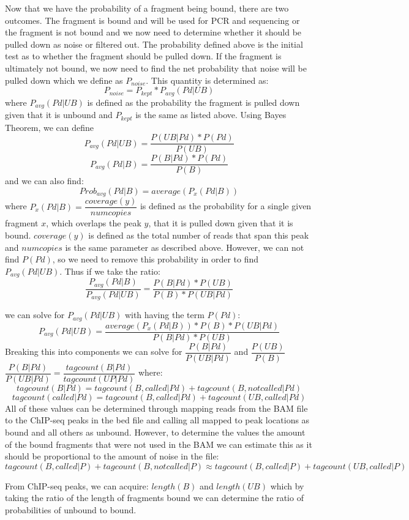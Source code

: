 \documentclass[12pt]{article}
\begin{document}
Now that we have the probability of a fragment being bound, there are two outcomes. The fragment is bound and will be used for PCR and sequencing or the fragment is not bound and we now need to determine whether it should be pulled down as noise or filtered out. The probability defined above is the initial test as to whether the fragment should be pulled down. If the fragment is ultimately not bound, we now need to find the net probability that noise will be pulled down which we define as $P_{noise}$. This quantity is determined as:
$$P_{noise} = P_{kept}*P_{avg}(Pd|UB)$$
where $P_{avg}(Pd|UB)$ is defined as the probability the fragment is pulled down given that it is unbound and $P_{kept}$ is the same as listed above. Using Bayes Theorem, we can define
$$P_{avg}(Pd|UB) = \dfrac{P(UB|Pd)*P(Pd)}{P(UB)}$$
$$P_{avg}(Pd|B) = \dfrac{P(B|Pd)*P(Pd)}{P(B)}$$
and we can also find:
$$Prob_{avg}(Pd|B) = average(P_x(Pd|B))$$
where $P_x(Pd|B) = \dfrac{coverage(y)}{numcopies}$ is defined as the probability for a single given fragment $x$, which overlaps the peak $y$, that it is pulled down given that it is bound. $coverage(y)$ is defined as the total number of reads that span this peak and $numcopies$ is the same parameter as described above. However, we can not find $P(Pd)$, so we need to remove this probability in order to find $P_{avg}(Pd|UB)$.
Thus if we take the ratio:
$$\dfrac{P_{avg}(Pd|B)}{P_{avg}(Pd|UB)} = \dfrac{P(B|Pd)*P(UB)}{P(B)*P(UB|Pd)}$$

we can solve for $P_{avg}(Pd|UB)$ with having the term $P(Pd)$:
$$P_{avg}(Pd|UB) = \dfrac{average(P_x(Pd|B))*P(B)*P(UB|Pd)}{P(B|Pd)*P(UB)}$$
Breaking this into components we can solve for $\dfrac{P(B|Pd)}{P(UB|Pd)}$ and $\dfrac{P(UB)}{P(B)}$
$\dfrac{P(B|Pd)}{P(UB|Pd)} = \dfrac{tagcount(B|Pd)}{tagcount(UP|Pd)}$
where: 
$$tagcount(B|Pd) = tagcount(B, called|Pd) + tagcount(B, not called|Pd)$$
$$tagcount(called|Pd) = tagcount(B, called|Pd) + tagcount(UB, called|Pd)$$
All of these values can be determined through mapping reads from the BAM file to the ChIP-seq peaks in the bed file and calling all mapped to peak locations as bound and all others as unbound. However, to determine the values the amount of the bound fragments that were not used in the BAM we can estimate this as it should be proportional to the amount of noise in the file:
$$tagcount(B, called|P) + tagcount(B, not called|P) \approx tagcount(B, called|P) + tagcount(UB, called|P)$$

From ChIP-seq peaks, we can acquire: $length(B)$ and $length(UB)$ which by taking the ratio of the length of fragments bound we can determine the ratio of probabilities of unbound to bound.
\end{document}
